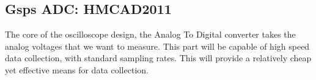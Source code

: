 \subsection{Gsps ADC: HMCAD2011}
	The core of the oscilloscope design, the Analog To Digital converter takes the analog voltages that we want to measure. This part will be capable of high speed data collection, with standard sampling rates. This will provide a relatively cheap yet effective means for data collection.